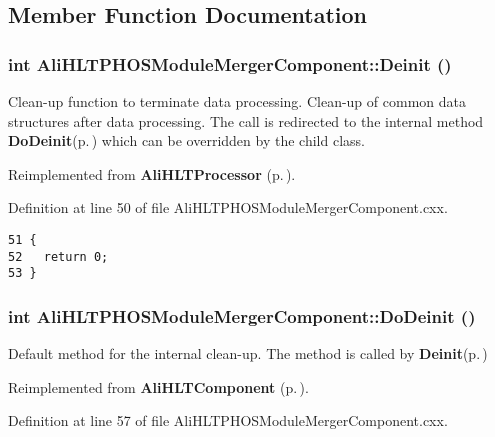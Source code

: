\subsection{Member Function Documentation}
\subsubsection{\setlength{\rightskip}{0pt plus 5cm}int Ali\-HLTPHOSModule\-Merger\-Component::Deinit ()\hspace{0.3cm}{\tt  [virtual]}}\label{classAliHLTPHOSModuleMergerComponent_a5}


Clean-up function to terminate data processing. Clean-up of common data structures after data processing. The call is redirected to the internal method {\bf Do\-Deinit}{\rm (p.\,\pageref{classAliHLTPHOSModuleMergerComponent_a6})} which can be overridden by the child class. 

Reimplemented from {\bf Ali\-HLTProcessor} {\rm (p.\,\pageref{classAliHLTProcessor_a3})}.

Definition at line 50 of file Ali\-HLTPHOSModule\-Merger\-Component.cxx.

\footnotesize\begin{verbatim}51 {
52   return 0;
53 }
\end{verbatim}\normalsize 


\subsubsection{\setlength{\rightskip}{0pt plus 5cm}int Ali\-HLTPHOSModule\-Merger\-Component::Do\-Deinit ()\hspace{0.3cm}{\tt  [virtual]}}\label{classAliHLTPHOSModuleMergerComponent_a6}


Default method for the internal clean-up. The method is called by {\bf Deinit}{\rm (p.\,\pageref{classAliHLTPHOSModuleMergerComponent_a5})} 

Reimplemented from {\bf Ali\-HLTComponent} {\rm (p.\,\pageref{classAliHLTComponent_b6})}.

Definition at line 57 of file Ali\-HLTPHOSModule\-Merger\-Component.cxx.

